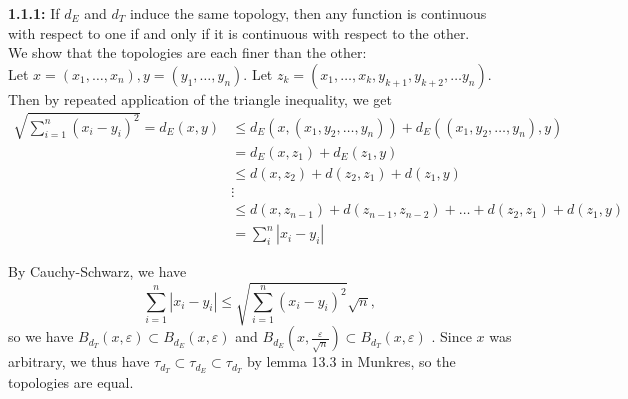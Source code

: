 \documentclass[a4paper]{article}
\begin{document}
\textbf{1.1.1:} 
If $d_E$ and $d_T$ induce the same topology, then any function is continuous
with respect to one if and only if it is continuous with respect to the
other.\\
We show that the topologies are each finer than the other:\\
\linebreak
Let $x = (x_1, \ldots, x_n), y = (y_1, \ldots, y_n)$. 
Let $z_k = \left( x_1, \ldots, x_k, y_{k+1}, y_{k+2}, \ldots y_n \right) $. Then
by repeated application of the triangle inequality, we get
\begin{align*}
    \sqrt{\sum_{i=1}^{n} \left( x_i - y_i \right)^2} 
    = d_E (x,y) &\le d_E \left( x, \left( x_1, y_2, \ldots, y_n \right)  \right) 
+ d_E \left( \left( x_1, y_2, \ldots, y_n \right) , y \right) \\
&= d_E\left( x, z_1 \right) + d_E \left( z_1, y \right) \\
&\le d(x, z_2) + d(z_2, z_1) + d\left( z_1, y \right) \\
&\vdots\\
&\le d(x,z_{n-1}) + d\left( z_{n-1}, z_{n-2} \right) +
\ldots + d\left( z_2, z_1 \right) + d(z_1, y)\\
&= \sum_{i}^{n} \left| x_i - y_i \right| 
\end{align*}



By Cauchy-Schwarz, we have
\[
\sum_{i=1}^{n} \left| x_i-y_i \right| \le \sqrt{\sum_{i=1}^{n} \left( x_i - y_i
\right)^2} \sqrt{n},
\] 
so we have $B_{d_T}(x,\varepsilon) \subset B_{d_E}(x,\varepsilon)$ and
$B_{d_E}(x, \frac{\varepsilon}{\sqrt{n} }) \subset B_{d_T}(x, \varepsilon)$
. Since $x$ was arbitrary, we thus have
$\tau_{d_T} \subset \tau_{d_E} \subset \tau_{d_T}$ by lemma 13.3 in Munkres, so the topologies are
equal.\\
\linebreak
\end{document}
